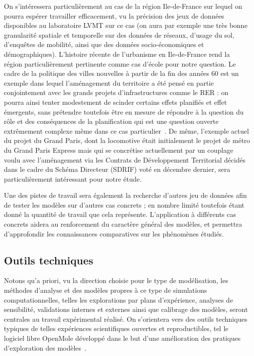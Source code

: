 \documentclass[french,12pt]{article}
\begin{document}
On s’intéressera particulièrement au cas de la région Ile-de-France sur lequel on pourra espérer travailler efficacement, vu la précision des jeux de données disponibles au laboratoire LVMT sur ce cas (on aura par exemple une très bonne granularité spatiale et temporelle sur des données de réseaux, d'usage du sol, d'enquêtes de mobilité, ainsi que des données socio-économiques et démographiques). L'histoire récente de l'urbanisme en Ile-de-France rend la région particulièrement pertinente comme cas d'école pour notre question. Le cadre de la politique des villes nouvelles à partir de la fin des années 60 est un exemple dans lequel l'aménagement du territoire a été pensé en partie conjointement avec les grands projets d'infrastructures comme le RER \cite{berroir2005contribution}: on pourra ainsi tenter modestement de scinder certains effets planifiés et effet émergents, sans prétendre toutefois être en mesure de répondre à la question du rôle et des conséquences de la planification qui est une question ouverte extrêmement complexe même dans ce cas particulier~\cite{es119}. %
De même, l'exemple actuel du projet du Grand Paris, dont la locomotive était initialement le projet de métro du Grand Paris Express mais qui se concrétise actuellement par un couplage voulu avec l'aménagement via les Contrats de Développement Territorial décidés dans le cadre du Schéma Directeur (SDRIF) voté en décembre dernier, sera particulièrement intéressant pour notre étude.

\bigskip

Une des pistes de travail sera également la recherche d'autres jeu de données afin de tester les modèles sur d'autres cas concrets ; en nombre limité toutefois étant donné la quantité de travail que cela représente. L'application à différents cas concrets aidera au renforcement du caractère général des modèles, et permettra d'approfondir les connaissances comparatives sur les phénomènes étudiés.

\bigskip

\subsection{Outils techniques}

Notons qu'a priori, vu la direction choisie pour le type de modélisation, les méthodes d'analyse et des modèles propres à ce type de simulations computationnelles, telles les explorations par plans d'expérience, analyses de sensibilité, validations internes et externes ainsi que calibrage des modèles, seront centrales au travail expérimental réalisé. On s'orientera vers des outils techniques typiques de telles expériences scientifiques ouvertes et reproductibles, tel le logiciel libre OpenMole développé dans le but d'une amélioration des pratiques d'exploration des modèles~\cite{reuillon2013openmole}.%
\end{document}
